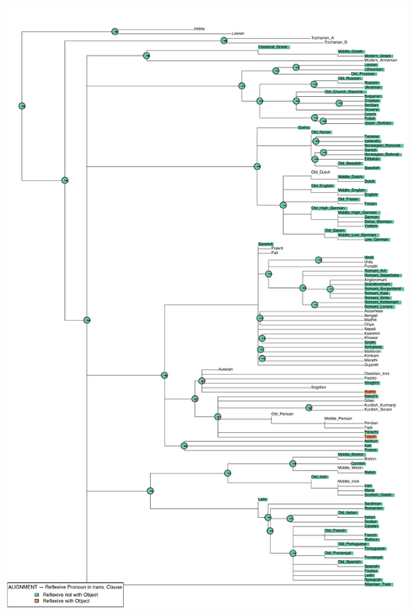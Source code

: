 \includegraphics[width=.9\linewidth]{supp-graphics/ALIGNMENTReflexivePronounintransClauseREFLrefO.pdf}

